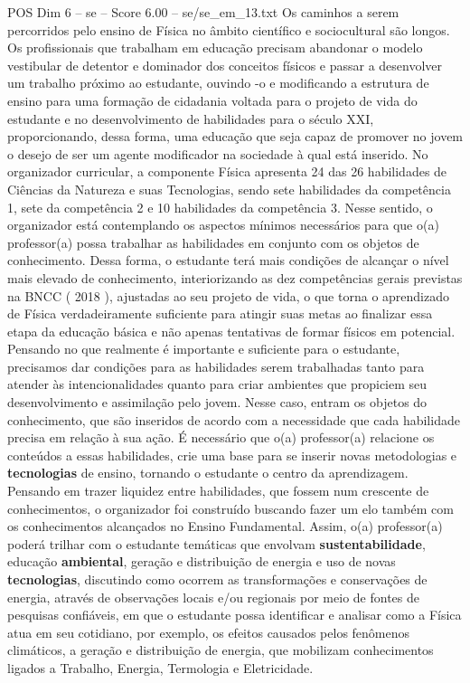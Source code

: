 \begin{textsample}{POS Dim 6 – se – Score 6.00 – se/se\_em\_13.txt}
Os caminhos a serem percorridos pelo ensino de Física no âmbito científico e sociocultural são longos.
Os profissionais que trabalham em educação precisam abandonar o modelo vestibular de detentor e dominador dos conceitos físicos e passar a desenvolver um trabalho próximo ao estudante, ouvindo -o e modificando a estrutura de ensino para uma formação de cidadania voltada para o projeto de vida do estudante e no desenvolvimento de habilidades para o século XXI, proporcionando, dessa forma, uma educação que seja capaz de promover no jovem o desejo de ser um agente modificador na sociedade à qual está inserido.
No organizador curricular, a componente Física apresenta 24 das 26 habilidades de Ciências da Natureza e suas Tecnologias, sendo sete habilidades da competência 1, sete da competência 2 e 10 habilidades da competência 3.
Nesse sentido, o organizador está contemplando os aspectos mínimos necessários para que o(a) professor(a) possa trabalhar as habilidades em conjunto com os objetos de conhecimento.
Dessa forma, o estudante terá mais condições de alcançar o nível mais elevado de conhecimento, interiorizando as dez competências gerais previstas na BNCC ( 2018 ), ajustadas ao seu projeto de vida, o que torna o aprendizado de Física verdadeiramente suficiente para atingir suas metas ao finalizar essa etapa da educação básica e não apenas tentativas de formar físicos em potencial.
Pensando no que realmente é importante e suficiente para o estudante, precisamos dar condições para as habilidades serem trabalhadas tanto para atender às intencionalidades quanto para criar ambientes que propiciem seu desenvolvimento e assimilação pelo jovem.
Nesse caso, entram os objetos do conhecimento, que são inseridos de acordo com a necessidade que cada habilidade precisa em relação à sua ação.
É necessário que o(a) professor(a) relacione os conteúdos a essas habilidades, crie uma base para se inserir novas metodologias e \textbf{tecnologias} de ensino, tornando o estudante o centro da aprendizagem.
Pensando em trazer liquidez entre habilidades, que fossem num crescente de conhecimentos, o organizador foi construído buscando fazer um elo também com os conhecimentos alcançados no Ensino Fundamental.
Assim, o(a) professor(a) poderá trilhar com o estudante temáticas que envolvam \textbf{sustentabilidade}, educação \textbf{ambiental}, geração e distribuição de energia e uso de novas \textbf{tecnologias}, discutindo como ocorrem as transformações e conservações de energia, através de observações locais e/ou regionais por meio de fontes de pesquisas confiáveis, em que o estudante possa identificar e analisar como a Física atua em seu cotidiano, por exemplo, os efeitos causados pelos fenômenos climáticos, a geração e distribuição de energia, que mobilizam conhecimentos ligados a Trabalho, Energia, Termologia e Eletricidade.

\end{textsample}
